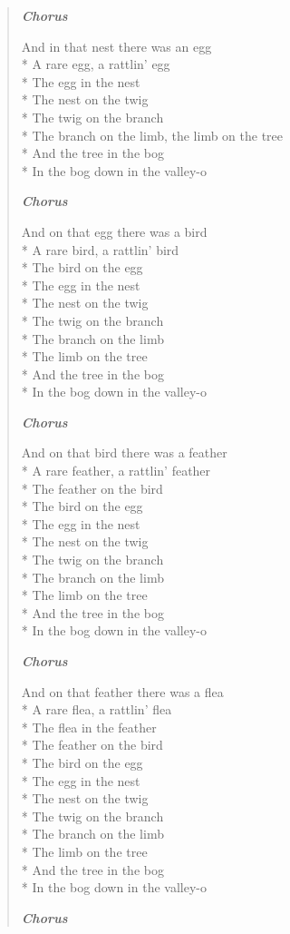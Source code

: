 \documentclass[9pt,twoside]{extarticle}
\newenvironment{xverse}{
	\begin{verse}
	\fontsize{8.5}{10.5}\selectfont
	}
	{
	\end{verse}
	\penalty 0
}
\newcommand{\chorusmark}[1][1]{%
\vspace{-0.5\stanzaskip}%
\textbf{\emph{Chorus \ifthenelse{\equal{#1}{1}}{}{$\times$ #1}}}%
\vspace{-0.5\stanzaskip}%
}
\begin{document}
\begin{xverse}
\chorusmark

And in that nest there was an egg \\*
A rare egg, a rattlin’ egg \\*
The egg in the nest \\*
The nest on the twig \\*
The twig on the branch \\*
The branch on the limb, the limb on the tree \\*
And the tree in the bog \\*
In the bog down in the valley-o

\chorusmark

And on that egg there was a bird \\*
A rare bird, a rattlin’ bird \\*
The bird on the egg \\*
The egg in the nest \\*
The nest on the twig \\*
The twig on the branch \\*
The branch on the limb \\*
The limb on the tree \\*
And the tree in the bog \\*
In the bog down in the valley-o

\chorusmark

And on that bird there was a feather \\*
A rare feather, a rattlin’ feather \\*
The feather on the bird \\*
The bird on the egg \\*
The egg in the nest \\*
The nest on the twig \\*
The twig on the branch \\*
The branch on the limb \\*
The limb on the tree \\*
And the tree in the bog \\*
In the bog down in the valley-o

\chorusmark

And on that feather there was a flea \\*
A rare flea, a rattlin’ flea \\*
The flea in the feather \\*
The feather on the bird \\*
The bird on the egg \\*
The egg in the nest \\*
The nest on the twig \\*
The twig on the branch \\*
The branch on the limb \\*
The limb on the tree \\*
And the tree in the bog \\*
In the bog down in the valley-o

\chorusmark[4]
\end{xverse}
\end{document}
